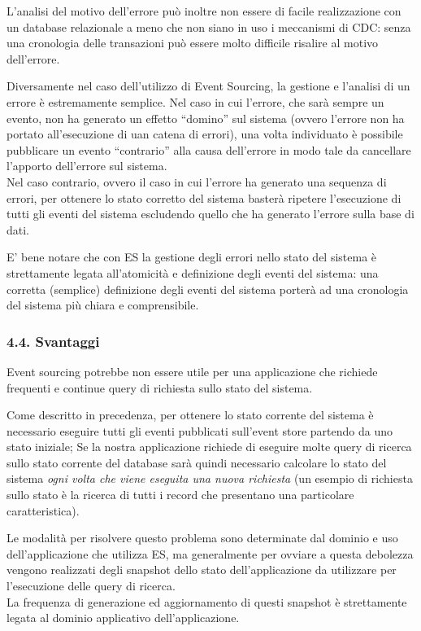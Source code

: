 \documentclass[]{article}
\begin{document}
L'analisi del motivo dell'errore può inoltre non essere di facile
realizzazione con un database relazionale a meno che non siano in uso i
meccanismi di CDC: senza una cronologia delle transazioni può essere
molto difficile risalire al motivo dell'errore.

Diversamente nel caso dell'utilizzo di Event Sourcing, la gestione e
l'analisi di un errore è estremamente semplice. Nel caso in cui
l'errore, che sarà sempre un evento, non ha generato un effetto
``domino'' sul sistema (ovvero l'errore non ha portato all'esecuzione di
uan catena di errori), una volta individuato è possibile pubblicare un
evento ``contrario'' alla causa dell'errore in modo tale da cancellare
l'apporto dell'errore sul sistema.\\
Nel caso contrario, ovvero il caso in cui l'errore ha generato una
sequenza di errori, per ottenere lo stato corretto del sistema basterà
ripetere l'esecuzione di tutti gli eventi del sistema escludendo quello
che ha generato l'errore sulla base di dati.

E' bene notare che con ES la gestione degli errori nello stato del
sistema è strettamente legata all'atomicità e definizione degli eventi
del sistema: una corretta (semplice) definizione degli eventi del
sistema porterà ad una cronologia del sistema più chiara e
comprensibile.

\newpage

\subsubsection{4.4. Svantaggi}\label{svantaggi}

Event sourcing potrebbe non essere utile per una applicazione che
richiede frequenti e continue query di richiesta sullo stato del
sistema.

Come descritto in precedenza, per ottenere lo stato corrente del sistema
è necessario eseguire tutti gli eventi pubblicati sull'event store
partendo da uno stato iniziale; Se la nostra applicazione richiede di
eseguire molte query di ricerca sullo stato corrente del database sarà
quindi necessario calcolare lo stato del sistema \emph{ogni volta che
viene eseguita una nuova richiesta} (un esempio di richiesta sullo stato
è la ricerca di tutti i record che presentano una particolare
caratteristica).

Le modalità per risolvere questo problema sono determinate dal dominio e
uso dell'applicazione che utilizza ES, ma generalmente per ovviare a
questa debolezza vengono realizzati degli snapshot dello stato
dell'applicazione da utilizzare per l'esecuzione delle query di
ricerca.\\
La frequenza di generazione ed aggiornamento di questi snapshot è
strettamente legata al dominio applicativo dell'applicazione.
\end{document}
